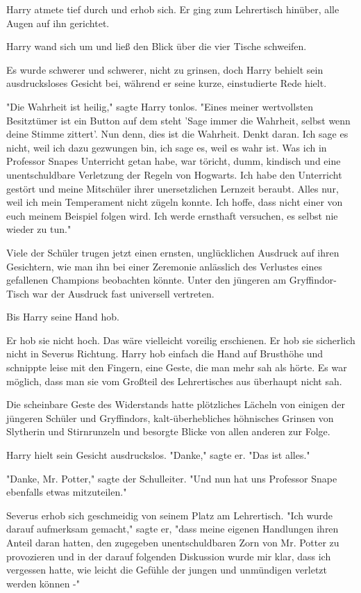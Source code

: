 {Harry atmete tief durch und erhob sich. Er ging zum Lehrertisch hinüber, alle Augen auf ihn gerichtet.

Harry wand sich um und ließ den Blick über die vier Tische schweifen.

Es wurde schwerer und schwerer, nicht zu grinsen, doch Harry behielt sein ausdrucksloses Gesicht bei, während er seine kurze, einstudierte Rede hielt.

"Die Wahrheit ist heilig," sagte Harry tonlos. "Eines meiner wertvollsten Besitztümer ist ein Button auf dem steht 'Sage immer die Wahrheit, selbst wenn deine Stimme zittert'. Nun denn, dies ist die Wahrheit. Denkt daran. Ich sage es nicht, weil ich dazu gezwungen bin, ich sage es, weil es wahr ist. Was ich in Professor Snapes Unterricht getan habe, war töricht, dumm, kindisch und eine unentschuldbare Verletzung der Regeln von Hogwarts. Ich habe den Unterricht gestört und meine Mitschüler ihrer unersetzlichen Lernzeit beraubt. Alles nur, weil ich mein Temperament nicht zügeln konnte. Ich hoffe, dass nicht einer von euch meinem Beispiel folgen wird. Ich werde ernsthaft versuchen, es selbst nie wieder zu tun."

Viele der Schüler trugen jetzt einen ernsten, unglücklichen Ausdruck auf ihren Gesichtern, wie man ihn bei einer Zeremonie anlässlich des Verlustes eines gefallenen Champions beobachten könnte. Unter den jüngeren am Gryffindor-Tisch war der Ausdruck fast universell vertreten.

Bis Harry seine Hand hob.

Er hob sie nicht hoch. Das wäre vielleicht voreilig erschienen. Er hob sie sicherlich nicht in Severus Richtung. Harry hob einfach die Hand auf Brusthöhe und schnippte leise mit den Fingern, eine Geste, die man mehr sah als hörte. Es war möglich, dass man sie vom Großteil des Lehrertisches aus überhaupt nicht sah.

Die scheinbare Geste des Widerstands hatte plötzliches Lächeln von einigen der jüngeren Schüler und Gryffindors, kalt-überhebliches höhnisches Grinsen von Slytherin und Stirnrunzeln und besorgte Blicke von allen anderen zur Folge.

Harry hielt sein Gesicht ausdruckslos. "Danke," sagte er. "Das ist alles."

"Danke, Mr. Potter," sagte der Schulleiter. "Und nun hat uns Professor Snape ebenfalls etwas mitzuteilen."

Severus erhob sich geschmeidig von seinem Platz am Lehrertisch. "Ich wurde darauf aufmerksam gemacht," sagte er, "dass meine eigenen Handlungen ihren Anteil daran hatten, den zugegeben unentschuldbaren Zorn von Mr. Potter zu provozieren und in der darauf folgenden Diskussion wurde mir klar, dass ich vergessen hatte, wie leicht die Gefühle der jungen und unmündigen verletzt werden können -"

}
